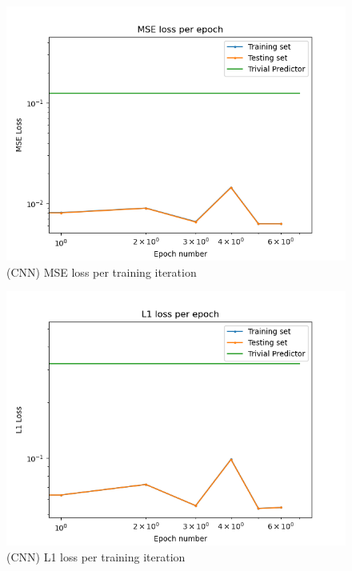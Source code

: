 



\begin{figure}[h]
  \centering
  \includegraphics[scale=0.7]{figures/recircflow/conv_train_mse.png}
  \caption{(CNN) MSE loss per training iteration}
\end{figure}

\begin{figure}[h]
  \centering
  \includegraphics[scale=0.7]{figures/recircflow/conv_train_l1.png}
  \caption{(CNN) L1 loss per training iteration}
\end{figure}

